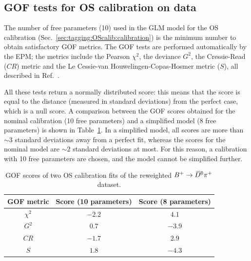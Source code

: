 \subsection[GOF tests for OS calibration on $\Bp\to\Dzb\pip$ data]{GOF tests for OS calibration on \boldmath{$\Bp\to\Dzb\pip$} data}
\label{app:chooseOSdegree}

The number of free parameters (10) used in the GLM model for the OS calibration (Sec.~\ref{sec:tagging:OScalib:calibration}) is the minimum number to 
obtain satisfactory GOF metrics. The GOF tests are performed automatically by the EPM; the metrics include the Pearson $\chi^2$, the deviance $G^2$, the Cressie-Read ($CR$) metric and the Le Cessie-van Houwelingen-Copas-Hosmer metric ($S$), all described in Ref.~\cite{EPM}.

All these tests return a normally distributed score: this means that the score is equal to the distance (measured in standard deviations) from the perfect case, which is a null score. A comparison between the GOF scores obtained for the nominal calibration (10 free parameters) and a simplified model (8 free parameters) is shown in Table~\ref{tab:gof_scores}. In a simplified model, all scores are more than $\sim 3$ standard deviations away from a perfect fit, whereas the scores for the nominal model are $\sim 2$ standard deviations at most. For this reason, a calibration with 10 free parameters are chosen, and the model cannot be simplified further. 

\begin{table}[htbp]
        \centering
        \caption{GOF scores of two OS calibration fits of the reweighted $\Bp\to\Dzb\pip$ dataset.}
        \begin{tabular}{ccc}
                \toprule
                GOF metric & Score (10 parameters) & Score (8 parameters)\\
                \midrule
                $\chi^2$ & $-2.2$ & $4.1$ \\  
                $G^2$ & $0.7$ & $-3.9$ \\
                $CR$ & $-1.7$ & $2.9$ \\
                $S$ & $1.8$ & $-4.3$ \\
                \bottomrule
        \end{tabular}
        \label{tab:gof_scores}
\end{table}
